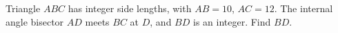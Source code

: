 Triangle $ABC$ has integer side lengths, with $AB=10$, $AC=12$. The internal angle bisector $AD$ meets $BC$ at $D$, and $BD$ is an integer. Find $BD$.
